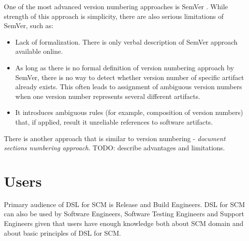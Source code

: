 \documentclass[11pt]{article}
\begin{document}
One of the most advanced version numbering approaches is SemVer \cite{semver}. While strength of this approach is simplicity, there are also serious limitations of SemVer, such as:
\begin{itemize}
\item Lack of formalization. There is only verbal description of SemVer approach available online. 
\item As long as there is no formal definition of version numbering approach by SemVer, there is no way to detect whether version number of specific artifact already exists. This often leads to assignment of ambiguous version numbers when one version number represents several different artifacts.
\item It introduces ambiguous rules (for example, composition of version numbers) that, if applied, result it unreliable references to software artifacts.
\end{itemize}

There is another approach that is similar to version numbering - \textit{document sections numbering approach}. TODO: describe advantages and limitations.

\section{Users}
\label{sec:users}

Primary audience of DSL for SCM is Release and Build Engineers. DSL for SCM can also be used by Software Engineers, Software Testing Engineers and Support Engineers given that users have enough knowledge both about SCM domain and about basic principles of DSL for SCM. 
\end{document}
